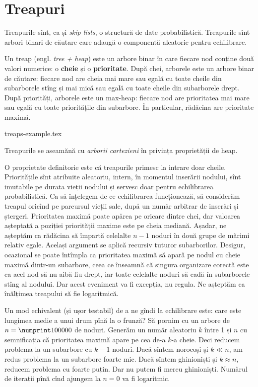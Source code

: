 \documentclass[../main.tex]{subfiles}
\begin{document}
\chapter{Treapuri}

Treapurile sînt, ca și \textit{skip lists}, o structură de date probabilistică. Treapurile sînt arbori binari de căutare care adaugă o componentă aleatorie pentru echilibrare.

Un treap (engl. \textit{tree + heap}) este un arbore binar în care fiecare nod conține două valori numerice: o \textbf{cheie} și o \textbf{prioritate}. După chei, arborele este un arbore binar de căutare: fiecare nod are cheia mai mare sau egală cu toate cheile din subarborele stîng și mai mică sau egală cu toate cheile din subarborele drept. După priorități, arborele este un max-heap: fiecare nod are prioritatea mai mare sau egală cu toate prioritățile din subarbore. În particular, rădăcina are prioritate maximă.

{treaps-example.tex}

Treapurile se aseamănă cu \textit{arborii cartezieni} în privința proprietății de heap.

O proprietate definitorie este că treapurile primesc la intrare doar cheile. Prioritățile sînt atribuite aleatoriu, intern, în momentul inserării nodului, sînt imutabile pe durata vieții nodului și servesc doar pentru echilibrarea probabilistică. Ca să înțelegem de ce echilibrarea funcționează, să considerăm treapul oricînd pe parcursul vieții sale, după un număr arbitrar de inserări și ștergeri. Prioritatea maximă poate apărea pe oricare dintre chei, dar valoarea așteptată a poziției priorității maxime este pe cheia mediană. Așadar, ne așteptăm ca rădăcina să împartă celelalte $n-1$ noduri în două grupe de mărimi relativ egale. Același argument se aplică recursiv tuturor subarborilor. Desigur, ocazional se poate întîmpla ca prioritatea maximă să apară pe nodul cu cheie maximă dintr-un subarbore, ceea ce înseamnă că singura organizare corectă este ca acel nod să nu aibă fiu drept, iar toate celelalte noduri să cadă în subarborele stîng al nodului. Dar acest eveniment va fi excepția, nu regula. Ne așteptăm ca înălțimea treapului să fie logaritmică.

Un mod echivalent (și ușor testabil) de a ne gîndi la echilibrare este: care este lungimea medie a unui drum pînă la o frunză? Să pornim cu un arbore de $n = \np{100000}$ de noduri.  Generăm un număr aleatoriu $k$ între 1 și $n$ cu semnificația că prioritatea maximă apare pe cea de-a $k$-a cheie. Deci reducem problema la un subarbore cu $k-1$ noduri. Dacă sîntem norocoși și $k \ll n$, am redus problema la un subarbore foarte mic. Dacă sîntem ghinioniști și $k \approx n$, reducem problema cu foarte puțin. Dar nu putem fi mereu ghinioniști. Numărul de iterații pînă cînd ajungem la $n = 0$ va fi logaritmic.
\end{document}
